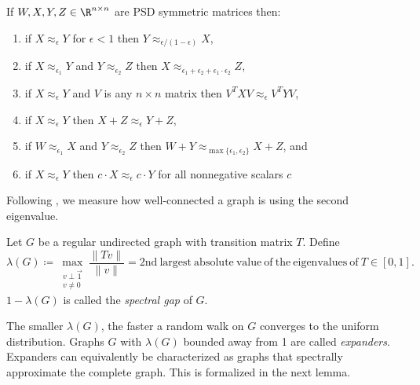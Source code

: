 \documentclass{toc}
\numberwithin{myalgctr}{section}
\theoremstyle{named}
\begin{document}
\begin{proposition}
\label{prop:psdfacts}
If $W,X, Y,Z\in \R^{n\times n}$ are PSD symmetric matrices then: 
\begin{enumerate}
\item if $X\approx_{\epsilon}Y$ for $\epsilon<1$ then $Y\approx_{\epsilon/(1-\epsilon)}X$,
\item if $X\approx_{\epsilon_1}Y$ and $Y\approx_{\epsilon_2}Z$ then $X\approx_{\epsilon_1 + \epsilon_2+\epsilon_1\cdot\epsilon_2}Z$,
\item if $X\approx_{\epsilon}Y$ and $V$ is any $n\times n$ matrix then $V^{T}XV\approx_{\epsilon}V^{T}YV$,
\item if $X\approx_{\epsilon}Y$ then $X+Z\approx_{\epsilon} Y+Z$,
\item if $W\approx_{\epsilon_1} X$ and $Y\approx_{\epsilon_2} Z$ then $W+Y\approx_{\max\{\epsilon_1,\epsilon_2\}} X+Z$, and
\item if $X\approx_{\epsilon}Y$ then $c\cdot X\approx_{\epsilon}c\cdot Y$ for all nonnegative scalars $c$
\end{enumerate}
\end{proposition}
Following \cite{Tanner84,AlonMi85, Alon86a}, we measure how well-connected a graph is using the second eigenvalue.
\begin{definition} 
\label{def:expansion}
Let $G$ be a regular undirected graph with transition matrix $T$. Define
\[
\lambda(G)\coloneqq\max_{\substack{v\perp\vec{1}\\ v\neq 0}}\frac{\|Tv\|}{\|v\|}=\mathrm{2nd~largest ~absolute~value ~of ~the~ eigenvalues~ of ~}T\in[0,1].
\]
$1-\lambda(G)$ is called the \emph{spectral gap} of $G$.
\end{definition}
%
The smaller $\lambda(G)$, the faster a random walk on $G$ converges to the uniform distribution. Graphs $G$ with $\lambda(G)$ bounded away from 1 are called \emph{expanders}. Expanders can equivalently be characterized as graphs that spectrally approximate the complete graph. This is formalized in the next lemma.
\end{document}
